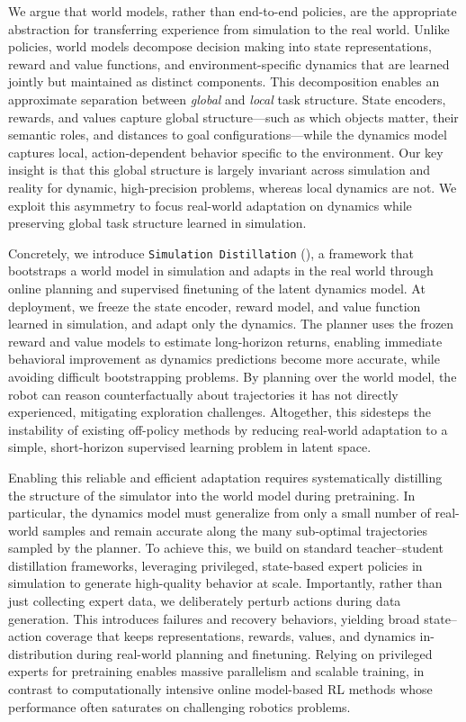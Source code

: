 We argue that world models, rather than end-to-end policies, are the appropriate abstraction for transferring experience from simulation to the real world. Unlike policies, world models decompose decision making into state representations, reward and value functions, and environment-specific dynamics that are learned jointly but maintained as distinct components. This decomposition enables an approximate separation between \emph{global} and \emph{local} task structure. State encoders, rewards, and values capture global structure—such as which objects matter, their semantic roles, and distances to goal configurations—while the dynamics model captures local, action-dependent behavior specific to the environment. Our key insight is that this global structure is largely invariant across simulation and reality for dynamic, high-precision problems, whereas local dynamics are not. We exploit this asymmetry to focus real-world adaptation on dynamics while preserving global task structure learned in simulation. 

Concretely, we introduce \texttt{Simulation Distillation} (\Method), a framework that bootstraps a world model in simulation and adapts in the real world through online planning and supervised finetuning of the latent dynamics model. At deployment, we freeze the state encoder, reward model, and value function learned in simulation, and adapt only the dynamics. The planner uses the frozen reward and value models to estimate  long-horizon returns, enabling immediate behavioral improvement as dynamics predictions become more accurate, while avoiding difficult bootstrapping problems. By planning over the world model, the robot can reason counterfactually about trajectories it has not directly experienced, mitigating exploration challenges. Altogether, this sidesteps the instability of existing off-policy methods by reducing real-world adaptation to a simple, short-horizon supervised learning problem in latent space. 

Enabling this reliable and efficient adaptation requires systematically distilling the structure of the simulator into the world model during pretraining. In particular, the dynamics model must generalize from only a small number of real-world samples and remain accurate along the many sub-optimal trajectories sampled by the planner. To achieve this, we build on standard teacher–student distillation frameworks, leveraging privileged, state-based expert policies in simulation to generate high-quality behavior at scale. Importantly, rather than just collecting expert data, we deliberately perturb actions during data generation. This introduces failures and recovery behaviors, yielding broad state–action coverage that keeps representations, rewards, values, and dynamics in-distribution during real-world planning and finetuning. Relying on privileged experts for pretraining enables massive parallelism and scalable training, in contrast to computationally intensive online model-based RL methods \cite{hafnerdream,hansen2022temporal} whose performance often saturates on challenging robotics problems.


